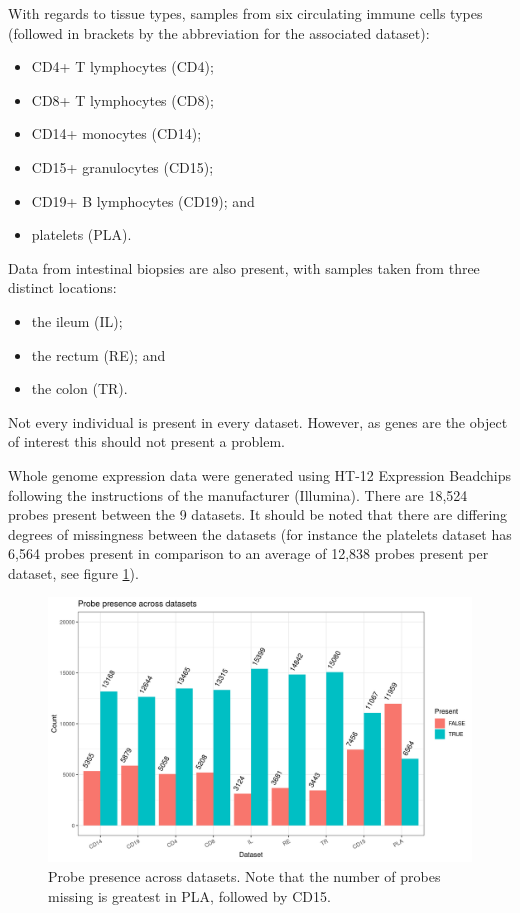 \documentclass[12pt]{article} %
\begin{document}
	With regards to tissue types, samples from six circulating immune cells types (followed in brackets by the abbreviation for the associated dataset):
	\begin{itemize}
		\item CD4+ T lymphocytes (CD4);
		\item CD8+ T lymphocytes (CD8);
		\item CD14+ monocytes (CD14);
		\item CD15+ granulocytes (CD15);
		\item CD19+ B lymphocytes (CD19); and 
		\item platelets (PLA).
	\end{itemize}
	Data from intestinal biopsies are also present, with samples taken from three distinct locations:
	\begin{itemize}
		\item the ileum (IL);
		\item the rectum (RE); and
		\item the colon (TR).
	\end{itemize} 
	Not every individual is present in every dataset. However, as genes are the object of interest this should not present a problem.
	
	Whole genome expression data were generated using HT-12 Expression Beadchips following the instructions of the manufacturer (Illumina). There are 18,524 probes present between the 9 datasets. It should be noted that there are differing degrees of missingness between the datasets (for instance the platelets dataset has 6,564 probes present in comparison to an average of 12,838 probes present per dataset, see figure \ref{fig:probe_presence_across_datasets}).
	
	\begin{figure}
		\centering
		\includegraphics[scale=0.9 ]{Images/Data_inspection/probe_presence_across_datasets_no_all.png}
		\caption{Probe presence across datasets. Note that the number of probes missing is greatest in PLA, followed by CD15.}
		\label{fig:probe_presence_across_datasets}
	\end{figure}
	
\end{document}
